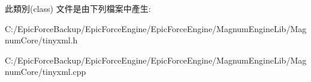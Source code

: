 此類別(class) 文件是由下列檔案中產生\+:\begin{DoxyCompactItemize}
\item 
C\+:/\+Epic\+Force\+Backup/\+Epic\+Force\+Engine/\+Epic\+Force\+Engine/\+Magnum\+Engine\+Lib/\+Magnum\+Core/tinyxml.\+h\item 
C\+:/\+Epic\+Force\+Backup/\+Epic\+Force\+Engine/\+Epic\+Force\+Engine/\+Magnum\+Engine\+Lib/\+Magnum\+Core/tinyxml.\+cpp\end{DoxyCompactItemize}

